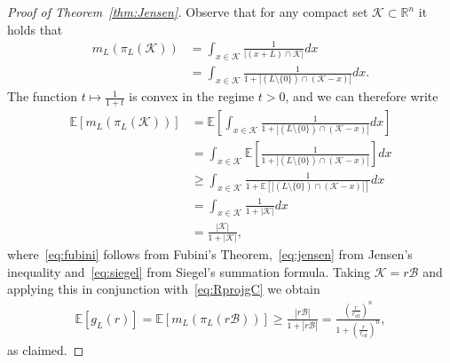 \documentclass[article,doublecolumn]{IEEEtran}
\newcommand{\EE}{{\mathbb{E}}}
\newcommand{\R}{{\mathbb{R}}}
\newcommand{\KK}{{\mathcal{K}}}
\newcommand{\mBeuc}{{\mathcal{B}}}
\newcommand{\reff}{{r_{\mathrm{eff}}}}
\newcommand{\VcdfL}{g_L}
\begin{document}
\begin{proof}[Proof of Theorem~\ref{thm:Jensen}]
Observe that for any compact set $\KK\subset\R^n$ it holds that
\begin{align}
m_L(\pi_{L}(\KK))&=\int_{x\in\KK}\frac{1}{|(x+L)\cap \KK|}dx\\
&=\int_{x\in\KK}\frac{1}{1+|(L\setminus\{0\})\cap (\KK-x)|}dx.
\label{eq:Rnprojectionvolume}
\end{align}    
The function $t\mapsto \frac{1}{1+t}$ is convex in the regime $t>0$, and we can therefore write
\begin{align}
\mathbb{E}[m_L(\pi_L(\KK))]
&= \mathbb{E}\left[\int_{x\in \KK}\frac{1}{1+|(L\setminus\{0\})\cap (\KK-x)|}dx\right]\nonumber\\
&= \int_{x\in \KK}\mathbb{E}\left[\frac{1}{1+|(L\setminus\{0\})\cap (\KK-x)|}\right]dx\label{eq:fubini}\\
&\geq \int_{x\in \KK}\frac{1}{1+\mathbb{E}\left[|(L\setminus\{0\})\cap (\KK-x)|\right]}dx\label{eq:jensen}\\
&=\int_{x\in \KK}\frac{1}{1+|\KK|}dx\label{eq:siegel}\\
&=\frac{|\KK|}{1+|\KK|},\label{eq:Eml_lb}
\end{align}
where~\eqref{eq:fubini} follows from Fubini's Theorem,~\eqref{eq:jensen} from Jensen's inequality and~\eqref{eq:siegel} from Siegel's summation formula. Taking $\KK=r\mBeuc$ and applying this in conjunction with~\eqref{eq:RprojgC} we obtain
\begin{align}
\EE[\VcdfL(r)]=\EE[m_L(\pi_L(r\mBeuc))]\geq \frac{|r\mBeuc|}{1+|r\mBeuc|}= \frac{\left(\frac{r}{\reff}\right)^{n}}{1+\left(\frac{r}{\reff}\right)^{n}},
\end{align}
as claimed.
\end{proof}
\end{document}
